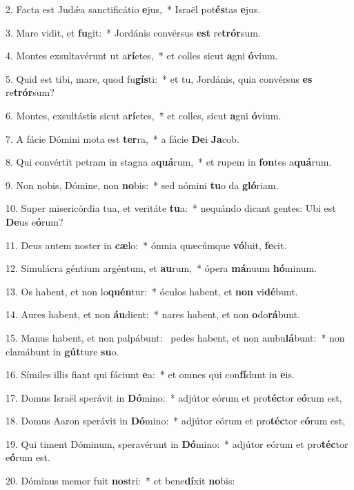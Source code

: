 2. Facta est Judǽa sanctificátio \textbf{e}jus,~*  Israël pot\textbf{és}tas \textbf{e}jus.\

3. Mare vidit, et \textbf{fu}git:~*  Jordánis convérsus \textbf{est} re\textbf{trór}sum.\

4. Montes exsultavérunt ut a\textbf{rí}etes,~*  et colles sicut \textbf{a}gni \textbf{ó}vium.\

5. Quid est tibi, mare, quod fu\textbf{gís}ti:~*  et tu, Jordánis, quia convérsus \textbf{es} re\textbf{trór}sum?\

6. Montes, exsultástis sicut a\textbf{rí}etes,~*  et colles, sicut \textbf{a}gni \textbf{ó}vium.\

7. A fácie Dómini mota est \textbf{ter}ra,~*  a fácie \textbf{De}i \textbf{Ja}cob.\

8. Qui convértit petram in stagna a\textbf{quá}rum,~*  et rupem in \textbf{fon}tes a\textbf{quá}rum.\

9. Non nobis, Dómine, non \textbf{no}bis:~*  sed nómini \textbf{tu}o da \textbf{gló}riam.\

10. Super misericórdia tua, et veritáte \textbf{tu}a:~*  nequándo dicant gentes: Ubi est \textbf{De}us e\textbf{ó}rum?\

11. Deus autem noster in \textbf{cæ}lo:~*  ómnia quæcúmque \textbf{vó}luit, \textbf{fe}cit.\

12. Simulácra géntium argéntum, et \textbf{au}rum,~*  ópera \textbf{má}nuum \textbf{hó}minum.\

13. Os habent, et non lo\textbf{quén}tur:~*  óculos habent, et \textbf{non} vi\textbf{dé}bunt.\

14. Aures habent, et non \textbf{áu}dient:~*  nares habent, et non \textbf{o}do\textbf{rá}bunt.\

15. Manus habent, et non palpábunt: \dag\  pedes habent, et non ambu\textbf{lá}bunt:~*  non clamábunt in \textbf{gút}ture \textbf{su}o.\

16. Símiles illis fiant qui fáciunt \textbf{e}a:~*  et omnes qui con\textbf{fí}dunt in \textbf{e}is.\

17. Domus Israël sperávit in \textbf{Dó}mino:~*  adjútor eórum et pro\textbf{téc}tor e\textbf{ó}rum est,\

18. Domus Aaron sperávit in \textbf{Dó}mino:~*  adjútor eórum et pro\textbf{téc}tor e\textbf{ó}rum est,\

19. Qui timent Dóminum, speravérunt in \textbf{Dó}mino:~*  adjútor eórum et pro\textbf{téc}tor e\textbf{ó}rum est.\

20. Dóminus memor fuit \textbf{nos}tri:~*  et bene\textbf{dí}xit \textbf{no}bis:\

